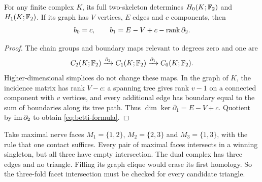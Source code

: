 \begin{proposition}\label{prop:two-skeleton}
For any finite complex $K$, its full two-skeleton determines $H_0(K;\mathbb F_2)$ and $H_1(K;\mathbb F_2)$. If its graph has $V$ vertices, $E$ edges and $c$ components, then
\begin{equation}\label{eq:betti-formula}
b_0=c,\qquad b_1=E-V+c-\operatorname{rank}\partial_2.
\end{equation}
\end{proposition}
\begin{proof}
The chain groups and boundary maps relevant to degrees zero and one are
\[
C_2(K;\mathbb F_2)\xrightarrow{\partial_2}C_1(K;\mathbb F_2)\xrightarrow{\partial_1}C_0(K;\mathbb F_2).
\]
Higher-dimensional simplices do not change these maps. In the graph of $K$, the incidence matrix has rank $V-c$: a spanning tree gives rank $v-1$ on a connected component with $v$ vertices, and every additional edge has boundary equal to the sum of boundaries along its tree path. Thus $\dim\ker\partial_1=E-V+c$. Quotient by $\operatorname{im}\partial_2$ to obtain \cref{eq:betti-formula}.
\end{proof}

\begin{example}
Take maximal nerve faces $M_1=\{1,2\}$, $M_2=\{2,3\}$ and $M_3=\{1,3\}$, with the rule that one contact suffices. Every pair of maximal faces intersects in a winning singleton, but all three have empty intersection. The dual complex has three edges and no triangle. Filling its graph clique would erase its first homology. So the three-fold facet intersection must be checked for every candidate triangle.
\end{example}
